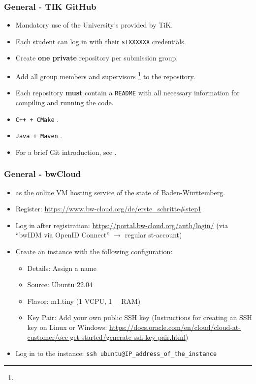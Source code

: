 \begin{frame}
  \frametitle{General - TIK GitHub}
  \begin{itemize}
    \item Mandatory use of the University's provided  by TiK.
    \item Each student can log in with their \texttt{stXXXXXX} credentials.
    \item Create \textbf{one private} repository per submission group.
    \item Add all group members and supervisors \footnote{\supervisorAc} to the repository.
    \item Each repository \textbf{must} contain a \texttt{README} with all necessary information for compiling and running the code.
    \item \texttt{C++ + CMake} .
    \item \texttt{Java + Maven} .
    \url{}
    \item For a brief Git introduction, see .
  \end{itemize}
\end{frame}

\begin{frame}
  \frametitle{General - bwCloud}
  \begin{itemize}
    \item {} as the online VM hosting service of the state of Baden-Württemberg.
    \item Register: \url{https://www.bw-cloud.org/de/erste_schritte\#step1}
    \item Log in after registration: \url{https://portal.bw-cloud.org/auth/login/} (via \enquote{bwIDM via OpenID Connect} $\rightarrow$ regular st-account)
    \item Create an instance with the following configuration:
    \begin{itemize}
        \item Details: Assign a name
        \item Source: Ubuntu 22.04
        \item Flavor: m1.tiny (1 VCPU, \SI{1}{\giga\byte} RAM)
        \item Key Pair: Add your own public SSH key (Instructions for creating an SSH key on Linux or Windows: \url{https://docs.oracle.com/en/cloud/cloud-at-customer/occ-get-started/generate-ssh-key-pair.html})
    \end{itemize}
    \item Log in to the instance: \texttt{ssh ubuntu@IP\_address\_of\_the\_instance}
  \end{itemize}
\end{frame}

